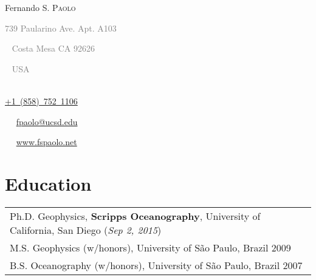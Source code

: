 \documentclass[a4paper,11pt]{article}
\newcommand*{\tbullet}{~\strut\textcolor{grey}{\LARGE\textbullet}~~}
\newcommand*{\tdash}{\strut\textcolor{grey}{\textemdash}~}
\begin{document}
\pagestyle{empty} 



\begin{center}
{\Huge 
Fernando S. \textsc{Paolo}
}\\[0.2cm]
%
\textcolor{grey}{
739 Paularino Ave. Apt. A103 \tdash 
Costa Mesa CA 92626 \tdash
USA
}\\[0.01cm]
%
\href{}{+1~(858)~752~1106} \tbullet 
\href{mailto:fpaolo@ucsd.edu}{fpaolo@ucsd.edu} \tbullet 
\href{http://fspaolo.net}{www.fspaolo.net}
\end{center}
\vspace*{0.7cm}

%


\section{Education}

\begin{tabular}{l}
Ph.D. Geophysics, \textbf{Scripps Oceanography}, University
    of California, San Diego (\emph{Sep 2, 2015})\\
M.S. Geophysics (w/honors), University of S\~ao Paulo, Brazil 2009\\
B.S. Oceanography (w/honors), University of S\~ao Paulo, Brazil 2007\\
\end{tabular}
\end{document}
